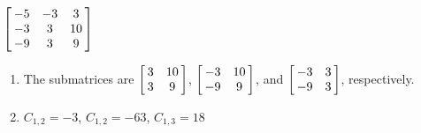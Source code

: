 {$\left[\hskip -3pt \begin{array}{ccc} -5&-3&3\\  -3&3&10
\\  -9&3&9\end{array}\hskip -3pt \right] $} 
{\begin{enumerate}
\item The submatrices are 
$\left[\hskip -3pt \begin{array}{cc} 3&10\\  3&9\end {array} \hskip -3pt
 \right]$, 
 $\left[\hskip -3pt \begin{array}{cc} -3&10\\  -9&9\end {array} \hskip -3pt
 \right]$, and 
 $\left[\hskip -3pt \begin{array}{cc} -3&3\\  -9&3\end {array} \hskip -3pt
 \right]$, respectively.
 \item	$C_{1,2}=-3$, $C_{1,2}=-63$, $C_{1,3}=18$
 \end{enumerate}
}

  

 

